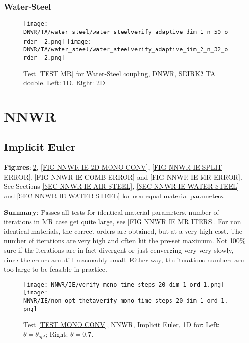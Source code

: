\documentclass[a4paper,10pt]{article}
\begin{document}
\FloatBarrier
\subsubsection{Water-Steel}\label{SEC DNWR TA DOUBLE WATER STEEL}
% 

\begin{figure}[!ht]
\texttt{[image: DNWR/TA/water\_steel/water\_steelverify\_adaptive\_dim\_1\_n\_50\_order\_-2.png]}
\texttt{[image: DNWR/TA/water\_steel/water\_steelverify\_adaptive\_dim\_2\_n\_32\_order\_-2.png]}
\caption{Test \ref{TEST MR} for Water-Steel coupling, DNWR, SDIRK2 TA double. Left: 1D. Right: 2D}
\label{FIG DNWR SDIRK2 TA DOUBLE WATER STEEL}
\end{figure}

\FloatBarrier
%
\section{NNWR}\label{SEC NNWR}
%
%
\subsection{Implicit Euler}\label{SEC NNWR IE}
% 
\textbf{Figures}: \ref{FIG NNWR IE 1D MONO CONV}, \ref{FIG NNWR IE 2D MONO CONV}, \ref{FIG NNWR IE SPLIT ERROR}, \ref{FIG NNWR IE COMB ERROR} and \ref{FIG NNWR IE MR ERROR}. See Sections \ref{SEC NNWR IE AIR STEEL}, \ref{SEC NNWR IE WATER STEEL} and \ref{SEC NNWR IE WATER STEEL} for non equal material parameters.

\textbf{Summary}: Passes all tests for identical material parameters, number of iterations in MR case get quite large, see \ref{FIG NNWR IE MR ITERS}. For non identical materials, the correct orders are obtained, but at a very high cost. The number of iterations are very high and often hit the pre-set maximum. Not 100\% sure if the iterations are in fact divergent or just converging very very slowly, since the errors are still reasonably small. Either way, the iterations numbers are too large to be feasible in practice.

% 
\begin{figure}[!ht]
\texttt{[image: NNWR/IE/verify\_mono\_time\_steps\_20\_dim\_1\_ord\_1.png]}
\texttt{[image: NNWR/IE/non\_opt\_thetaverify\_mono\_time\_steps\_20\_dim\_1\_ord\_1.png]}
\caption{Test \ref{TEST MONO CONV}, NNWR, Implicit Euler, 1D for: Left: $\theta = \theta_{opt}$; Right: $\theta = 0.7$.}
\label{FIG NNWR IE 1D MONO CONV}
\end{figure}
\end{document}
